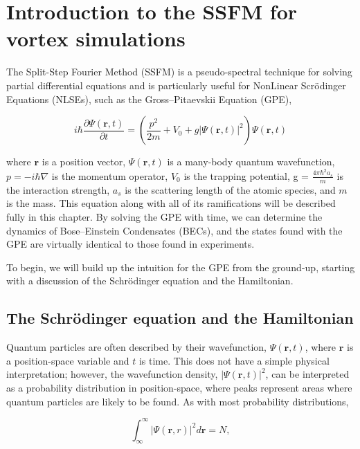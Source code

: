 \chapter{Introduction to the SSFM for vortex simulations}
\label{ch:splitop}

The Split-Step Fourier Method (SSFM) is a pseudo-spectral technique for solving partial differential equations and is particularly useful for NonLinear Scr\"odinger Equations (NLSEs), such as the Gross--Pitaevskii Equation (GPE),

$$
i \hbar \frac{\partial \Psi(\mathbf{r},t)}{\partial t} = \left(\frac{p^2}{2m} + V_0 + g |\Psi(\mathbf{r},t)|^2 \right)\Psi(\mathbf{r},t)
$$

\noindent where $\mathbf{r}$ is a position vector, $\Psi(\mathbf{r},t)$ is a many-body quantum wavefunction, $p = -i\hbar\nabla$ is the momentum operator, $V_0$ is the trapping potential, g = $\frac{4\pi\hbar^2 a_s}{m}$ is the interaction strength, $a_s$ is the scattering length of the atomic species, and $m$ is the mass.
This equation along with all of its ramifications will be described fully in this chapter.
By solving the GPE with time, we can determine the dynamics of Bose--Einstein Condensates (BECs), and
the states found with the GPE are virtually identical to those found in experiments.

To begin, we will build up the intuition for the GPE from the ground-up, starting with a discussion of the Schr\"odinger equation and the Hamiltonian.

\section{The Schr\"odinger equation and the Hamiltonian}


Quantum particles are often described by their wavefunction, $\Psi(\mathbf{r},t)$, where $\mathbf{r}$ is a position-space variable and $t$ is time.
This does not have a simple physical interpretation; however, the wavefunction density, $|\Psi(\mathbf{r},t)|^2$, can be interpreted as a probability distribution in position-space, where peaks represent areas where quantum particles are likely to be found.
As with most probability distributions,

\begin{equation}
    \label{eqn:norm}
    \int_\infty^\infty |\Psi(\mathbf{r},r)|^2 d\mathbf{r} = N,
\end{equation}

